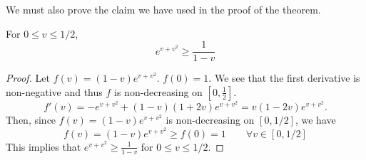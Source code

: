 We must also prove the claim we have used in the proof of the theorem.

\begin{lemma}
    For $0 \leq v \leq 1/2$,
    $$
    e^{v+v^2} \geq \frac{1}{1-v}
    $$
\end{lemma}
\begin{proof}
    Let $f(v) = (1-v) e^{v + v^2}$. $f(0)= 1$. We see that the first derivative is non-negative and thus $f$ is non-decreasing on $[0,\frac{1}{2}]$.
    $$
    f'(v) = -e^{v+v^2} + (1-v)(1+2v)e^{v+v^2} = v(1-2v)e^{v+v^2}.
    $$
    Then, since $f(v) = (1-v) e^{v+v^2}$ is non-decreasing on $[0,1/2]$, we have
    $$
    f(v) = (1-v) e^{v+v^2} \geq f(0) = 1 \qquad \forall v \in [0,1/2]
    $$
    This implies that $e^{v+v^2} \geq \frac{1}{1-v}$ for $0 \leq v \leq 1/2$.
\end{proof}
